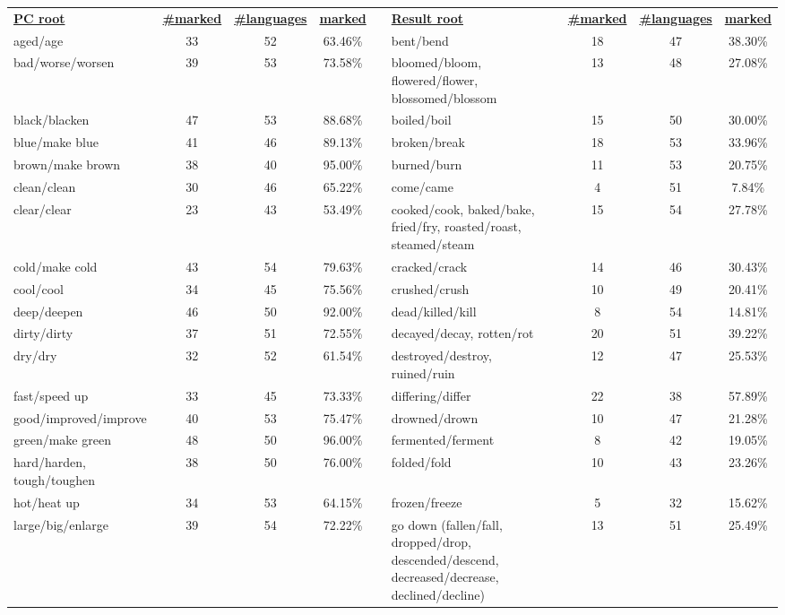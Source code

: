 \begin{tabular}{p{3cm}ccccp{3cm}ccc}
\underline{\textbf{PC root}} & \underline{\textbf{\#marked}} & \underline{\textbf{\#languages}} & \underline{\textbf{marked}} & & \underline{\textbf{Result root}} & \underline{\textbf{\#marked}} & \underline{\textbf{\#languages}} & \underline{\textbf{marked}} \\
aged/age & 33 & 52 & 63.46\% & & bent/bend & 18 & 47 & 38.30\% \\
bad/worse/worsen & 39 & 53 & 73.58\% & & bloomed/bloom, flowered/flower, blossomed/blossom & 13 & 48 & 27.08\% \\
black/blacken & 47 & 53 & 88.68\% & & boiled/boil & 15 & 50 & 30.00\% \\
blue/make blue & 41 & 46 & 89.13\% & & broken/break & 18 & 53 & 33.96\% \\
brown/make brown & 38 & 40 & 95.00\% & & burned/burn & 11 & 53 & 20.75\% \\
clean/clean & 30 & 46 & 65.22\% & & come/came & 4 & 51 & 7.84\% \\
clear/clear & 23 & 43 & 53.49\% & & cooked/cook, baked/bake, fried/fry, roasted/roast, steamed/steam & 15 & 54 & 27.78\% \\
cold/make cold & 43 & 54 & 79.63\% & & cracked/crack & 14 & 46 & 30.43\% \\
cool/cool & 34 & 45 & 75.56\% & & crushed/crush & 10 & 49 & 20.41\% \\
deep/deepen & 46 & 50 & 92.00\% & & dead/killed/kill & 8 & 54 & 14.81\% \\
dirty/dirty & 37 & 51 & 72.55\% & & decayed/decay, rotten/rot & 20 & 51 & 39.22\% \\
dry/dry & 32 & 52 & 61.54\% & & destroyed/destroy, ruined/ruin & 12 & 47 & 25.53\% \\
fast/speed up & 33 & 45 & 73.33\% & & differing/differ & 22 & 38 & 57.89\% \\
good/improved/improve & 40 & 53 & 75.47\% & & drowned/drown & 10 & 47 & 21.28\% \\
green/make green & 48 & 50 & 96.00\% & & fermented/ferment & 8 & 42 & 19.05\% \\
hard/harden, tough/toughen & 38 & 50 & 76.00\% & & folded/fold & 10 & 43 & 23.26\% \\
hot/heat up & 34 & 53 & 64.15\% & & frozen/freeze & 5 & 32 & 15.62\% \\
large/big/enlarge & 39 & 54 & 72.22\% & & go down (fallen/fall, dropped/drop, descended/descend, decreased/decrease, declined/decline) & 13 & 51 & 25.49\% \\

\end{tabular}
